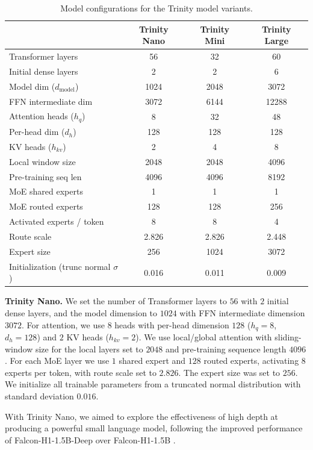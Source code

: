 \documentclass{article}
\begin{document}
\begin{table}[t]
\centering
\setlength{\tabcolsep}{6pt}
\caption{Model configurations for the Trinity model variants.}
\label{tab:trinity_specs}
\begin{tabular}{lccc}
\toprule
\textbf{} & Trinity Nano & Trinity Mini & Trinity Large \\
\midrule
Transformer layers & 56 & 32 & 60 \\
Initial dense layers & 2 & 2 & 6 \\
Model dim ($d_{\text{model}}$) & 1024 & 2048 & 3072 \\
FFN intermediate dim & 3072 & 6144 & 12288 \\
Attention heads ($h_q$) & 8 & 32 & 48 \\
Per-head dim ($d_h$) & 128 & 128 & 128 \\
KV heads ($h_{kv}$) & 2 & 4 & 8 \\
Local window size & 2048 & 2048 & 4096 \\
Pre-training seq len & 4096 & 4096 & 8192 \\
MoE shared experts & 1 & 1 & 1 \\
MoE routed experts & 128 & 128 & 256 \\
Activated experts / token & 8 & 8 & 4 \\
Route scale & 2.826 & 2.826 & 2.448 \\
Expert size & 256 & 1024 & 3072 \\
Initialization (trunc normal $\sigma$) & 0.016 & 0.011 & 0.009 \\
\bottomrule
\end{tabular}
\end{table}

\textbf{Trinity Nano.}
We set the number of Transformer layers to $56$ with $2$ initial dense layers, and the model dimension to $1024$ with FFN intermediate dimension $3072$.
For attention, we use $8$ heads with per-head dimension $128$ ($h_q{=}8$, $d_h{=}128$) and $2$ KV heads ($h_{kv}{=}2$).
We use local/global attention with sliding-window size for the local layers set to $2048$ and pre-training sequence length $4096$.
For each MoE layer we use $1$ shared expert and $128$ routed experts, activating $8$ experts per token, with route scale set to $2.826$. The expert size was set to $256$.
We initialize all trainable parameters from a truncated normal distribution with standard deviation $0.016$.

With Trinity Nano, we aimed to explore the effectiveness of high depth at producing a powerful small language model, following the improved performance of Falcon-H1-1.5B-Deep over Falcon-H1-1.5B \citep{zuo2025falconh1familyhybridheadlanguage}.
\end{document}
